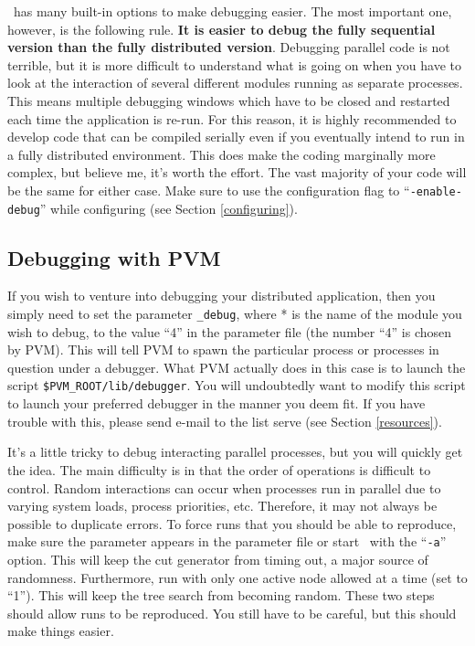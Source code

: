 \BB\ has many built-in options to make debugging easier. The most
important one, however, is the following rule. {\bf It is easier to
debug the fully sequential version than the fully distributed
version}. Debugging parallel code is not terrible, but it is more
difficult to understand what is going on when you have to look at the
interaction of several different modules running as separate
processes. This means multiple debugging windows which have to be
closed and restarted each time the application is re-run. For this
reason, it is highly recommended to develop code that can be compiled
serially even if you eventually intend to run in a fully distributed
environment. This does make the coding marginally more complex, but
believe me, it's worth the effort. The vast majority of your code will
be the same for either case. Make sure to use the configuration flag to
``{\tt -enable-debug}'' while configuring (see Section \ref{configuring}). 

\subsection{Debugging with PVM}
\label{debugging-PVM}
If you wish to venture into debugging your distributed application,
then you simply need to set the parameter {\tt *\_debug}, where * is
the name of the module you wish to debug, 
to the value ``4'' in the parameter file (the number ``4'' is chosen
by PVM). This will tell PVM to spawn the particular process or
processes in question under a debugger. What PVM actually does in this
case is to launch the script {\tt \$PVM\_ROOT/lib/debugger}. You will
undoubtedly want to modify this script to launch your preferred
debugger in the manner you deem fit. If you have trouble with this,
please send e-mail to the list serve (see Section \ref{resources}).

It's a little tricky to debug interacting parallel processes, but you
will quickly get the idea. The main difficulty is in that the order of
operations is difficult to control. Random interactions can occur when
processes run in parallel due to varying system loads, process
priorities, etc. Therefore, it may not always be possible to duplicate
errors. To force runs that you should be able to reproduce, make sure
the parameter  appears in the parameter file or
start \BB\ with the ``{\tt -a}'' option. This will keep the cut
generator from timing out, a major source of randomness. Furthermore,
run with only one active node allowed at a time (set  to ``1''). This will keep the tree search from
becoming random. These two steps should allow runs to be reproduced.
You still have to be careful, but this should make things easier.

